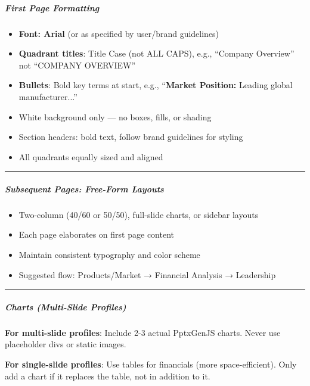 \documentclass[11pt]{article}
\begin{document}
\subparagraph{First Page Formatting}\mbox{}\par
\begin{itemize}[leftmargin=*,itemsep=2pt,topsep=2pt]
\item {} \textbf{Font: Arial} (or as specified by user/brand guidelines)
\item {} \textbf{Quadrant titles}: Title Case (not ALL CAPS), e.g., ``Company Overview'' not ``COMPANY OVERVIEW''
\item {} \textbf{Bullets}: Bold key terms at start, e.g., ``\textbf{Market Position:} Leading global manufacturer...''
\item {} White background only — no boxes, fills, or shading
\item {} Section headers: bold text, follow brand guidelines for styling
\item {} All quadrants equally sized and aligned
\end{itemize}

\vspace{0.5em}\hrule\vspace{0.5em}

\subparagraph{Subsequent Pages: Free-Form Layouts}\mbox{}\par

\begin{itemize}[leftmargin=*,itemsep=2pt,topsep=2pt]
\item {} Two-column (40/60 or 50/50), full-slide charts, or sidebar layouts
\item {} Each page elaborates on first page content
\item {} Maintain consistent typography and color scheme
\item {} Suggested flow: Products/Market → Financial Analysis → Leadership
\end{itemize}

\vspace{0.5em}\hrule\vspace{0.5em}

\subparagraph{Charts (Multi-Slide Profiles)}\mbox{}\par

\textbf{For multi-slide profiles}: Include 2-3 actual PptxGenJS charts. Never use placeholder divs or static images.


\textbf{For single-slide profiles}: Use tables for financials (more space-efficient). Only add a chart if it replaces the table, not in addition to it.
\end{document}
